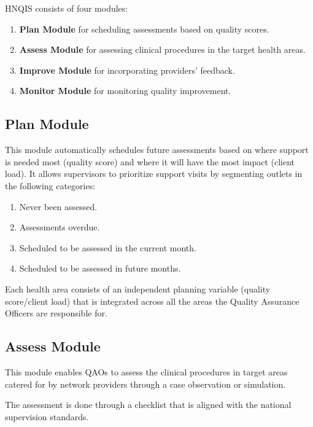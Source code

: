 \documentclass[]{book}
\providecommand{\tightlist}{%
  \setlength{\itemsep}{0pt}\setlength{\parskip}{0pt}}
\begin{document}
HNQIS consists of four modules:

\begin{enumerate}
\def\labelenumi{\arabic{enumi}.}
\tightlist
\item
  \textbf{Plan Module} for scheduling assessments based on quality scores.
\item
  \textbf{Assess Module} for assessing clinical procedures in the target health areas.\\
\item
  \textbf{Improve Module} for incorporating providers' feedback.
\item
  \textbf{Monitor Module} for monitoring quality improvement.
\end{enumerate}

\hypertarget{plan-module}{%
\subsection{Plan Module}\label{plan-module}}

This module automatically schedules future assessments based on where support is needed most (quality score) and where it will have the most impact (client load). It allows supervisors to prioritize support visits by segmenting outlets in the following categories:

\begin{enumerate}
\def\labelenumi{\arabic{enumi}.}
\tightlist
\item
  Never been assessed.
\item
  Assessments overdue.
\item
  Scheduled to be assessed in the current month.
\item
  Scheduled to be assessed in future months.
\end{enumerate}

Each health area consists of an independent planning variable (quality score/client load) that is integrated across all the areas the Quality Assurance Officers are responsible for.

\hypertarget{assess-module}{%
\subsection{Assess Module}\label{assess-module}}

This module enables QAOs to assess the clinical procedures in target areas catered for by network providers through a case observation or simulation.

The assessment is done through a checklist that is aligned with the national supervision standards.
\end{document}
